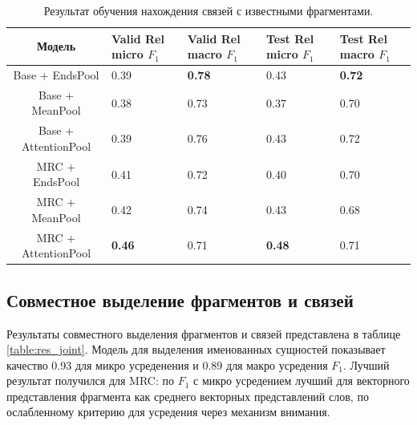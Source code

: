 \documentclass[12pt]{article}
\begin{document}
\begin{table}[h!]
\centering
\begin{tabular}{| c || p{2cm} | p{2cm} || p{2cm} | p{2cm} |} 
 \hline
 Модель & Valid Rel micro $F_1$ & Valid Rel macro $F_1$ & Test Rel micro $F_1$ & Test Rel macro $F_1$  \\ [0.5ex] 
 \hline\hline
 Base + EndsPool & 0.39 & \textbf{0.78} & 0.43 & \textbf{0.72} \\ 
 \hline
 Base + MeanPool & 0.38 & 0.73 & 0.37 & 0.70 \\ 
 \hline
 Base + AttentionPool & 0.39 & 0.76 & 0.43 & 0.72 \\ 
 \hline
 MRC + EndsPool & 0.41 & 0.72 & 0.40 & 0.70 \\ 
 \hline
 MRC + MeanPool & 0.42 & 0.74 & 0.43 & 0.68  \\ 
 \hline
 MRC + AttentionPool & \textbf{0.46} & 0.71 & \textbf{0.48} & 0.71
 \\[1ex] 
 \hline
\end{tabular}
\vspace{1ex}
\caption{Результат обучения нахождения связей с известными фрагментами.}
\label{table:res_clf}
\end{table}

\subsection{Совместное выделение фрагментов и связей}

Результаты совместного выделения фрагментов и связей представлена в таблице \ref{table:res_joint}. Модель для выделения именованных сущностей показывает качество 0.93 для микро усреденения и 0.89 для макро усредения $F_1$. Лучший результат получился для MRC: по $F_1$ с микро усредением лучший для векторного представления фрагмента как среднего векторных представлений слов, по ослабленному критерию для усредения через механизм внимания.
\end{document}
